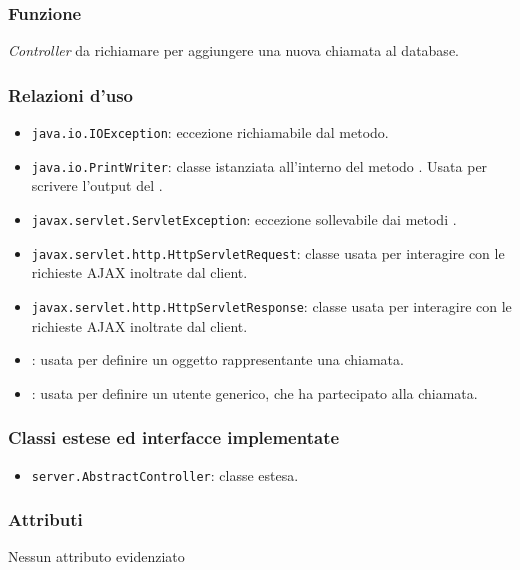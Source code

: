 
\subsubsection*{Funzione}
\textit{Controller} da richiamare per aggiungere una nuova chiamata al database.

\subsubsection*{Relazioni d'uso}
\begin{itemize}
	\item \texttt{java.io.IOException}: eccezione richiamabile dal metodo.
	\item \texttt{java.io.PrintWriter}: classe istanziata all'interno del metodo . Usata per scrivere l'output del .
	\item \texttt{javax.servlet.ServletException}: eccezione sollevabile dai metodi .
	\item \texttt{javax.servlet.http.HttpServletRequest}: classe usata per interagire con le richieste AJAX inoltrate dal client.
	\item \texttt{javax.servlet.http.HttpServletResponse}: classe usata per interagire con le richieste AJAX inoltrate dal client.
	\item {}: usata per definire un oggetto rappresentante una chiamata.
	\item {}: usata per definire un utente generico, che ha partecipato alla chiamata.
\end{itemize}

\subsubsection*{Classi estese ed interfacce implementate}
\begin{itemize}
	\item \texttt{server.AbstractController}: classe estesa.
\end{itemize}

\subsubsection*{Attributi}

Nessun attributo evidenziato

